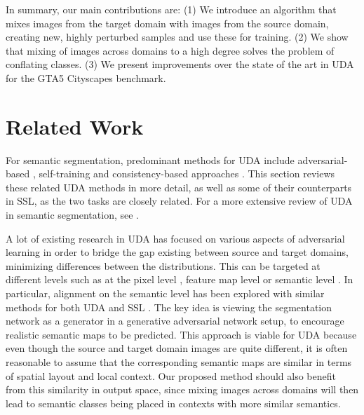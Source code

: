 \documentclass[10pt,twocolumn,letterpaper]{article}
\begin{document}
In summary, our main contributions are: (1) We introduce an algorithm that mixes images from the target domain with images from the source domain, creating new, highly perturbed samples and use these for training. (2) We show that mixing of images across domains to a high degree solves the problem of conflating classes.
(3) We present improvements over the state of the art in UDA for the GTA5  Cityscapes benchmark.

\section{Related Work}
For semantic segmentation, predominant methods for UDA include adversarial-based \cite{tsai2019domain}, self-training \cite{zou2018domain,zou2019confidence,zheng2020rectifying} and consistency-based approaches \cite{chen2020crdoco,zhou2020uncertaintyaware}. This section reviews these related UDA methods in more detail, as well as some of their counterparts in SSL, as the two tasks are closely related. For a more extensive review of UDA in semantic segmentation, see \cite{toldo2020unsupervised}.

\vspace{0.4cm}
 A lot of existing research in UDA has focused on various aspects of adversarial learning in order to bridge the gap existing between source and target domains, minimizing differences between the distributions. This can be targeted at different levels such as at the pixel level \cite{bousmalis2016unsupervised,hoffman2017cycada,wu2019ace, yang2020labelddriven}, feature map level \cite{yue2019domain,luo2019significanceaware,zhang2019manifold,hong2018conditional,zhu2018penalizing,wang2020differential,DBLP:conf/nips/ZhangZ0T19} or semantic level \cite{tsai2019domain,Wang2019classspecificrecon}. In particular, alignment on the semantic level has been explored with similar methods for both UDA \cite{tsai2019domain} and SSL \cite{Hung}. The key idea is viewing the segmentation network as a generator in a generative adversarial network setup, to encourage realistic semantic maps to be predicted. This approach is viable for UDA because even though the source and target domain images are quite different, it is often reasonable to assume that the corresponding semantic maps are similar in terms of spatial layout and local context. Our proposed method should also benefit from this similarity in output space, since mixing images across domains will then lead to semantic classes being placed in contexts with more similar semantics.
\end{document}
